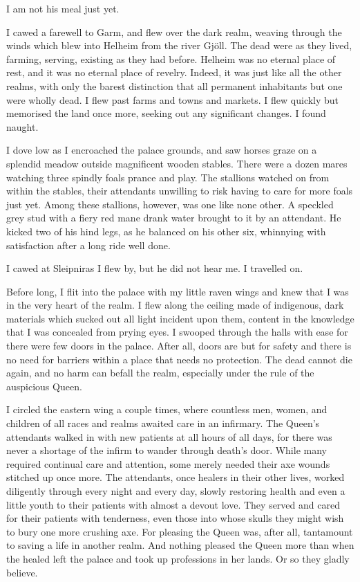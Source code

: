 
I am not his meal just yet.

I cawed a farewell to Garm, and flew over the dark realm, weaving through the winds which blew into Helheim from the river Gj{\"o}ll\footnotemark[1]. The dead were as they lived, farming, serving, existing as they had before. Helheim was no eternal place of rest, and it was no eternal place of revelry. Indeed, it was just like all the other realms, with only the barest distinction that all permanent inhabitants but one were wholly dead. I flew past farms and towns and markets. I flew quickly but memorised the land once more, seeking out any significant changes. I found naught. 

I dove low as I encroached the palace grounds, and saw horses graze on a splendid meadow outside magnificent wooden stables. There were a dozen mares watching three spindly foals prance and play. The stallions watched on from within the stables, their attendants unwilling to risk having to care for more foals just yet. Among these stallions, however, was one like none other. A speckled grey stud with a fiery red mane drank water brought to it by an attendant. He kicked two of his hind legs, as he balanced on his other six, whinnying with satisfaction after a long ride well done. 

I cawed at Sleipnir\footnotemark[2] as I flew by, but he did not hear me. I travelled on.

Before long, I flit into the palace with my little raven wings and knew that I was in the very heart of the realm. I flew along the ceiling made of indigenous, dark materials which sucked out all light incident upon them, content in the knowledge that I was concealed from prying eyes. I swooped through the halls with ease for there were few doors in the palace. After all, doors are but for safety and there is no need for barriers within a place that needs no protection. The dead cannot die again, and no harm can befall the realm, especially under the rule of the auspicious Queen. 

I circled the eastern wing a couple times, where countless men, women, and children of all races and realms awaited care in an infirmary. The Queen's attendants walked in with new patients at all hours of all days, for there was never a shortage of the infirm to wander through death's door.  While many required continual care and attention, some merely needed their axe wounds stitched up once more. The attendants, once healers in their other lives, worked diligently through every night and every day, slowly restoring health and even a little youth to their patients with almost a devout love. They served and cared for their patients with tenderness, even those into whose skulls they might wish to bury one more crushing axe. For pleasing the Queen was, after all, tantamount to saving a life in another realm. And nothing pleased the Queen more than when the healed left the palace and took up professions in her lands. Or so they gladly believe.

